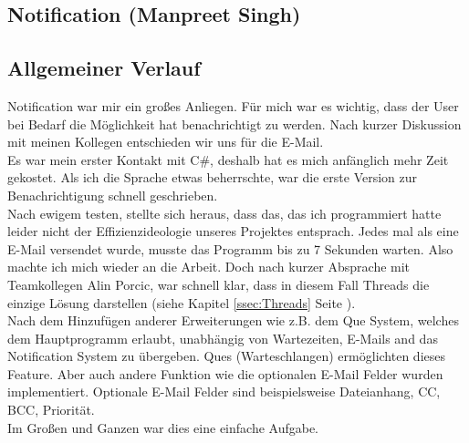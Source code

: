 \documentclass[12pt,a4paper]{report}
\begin{document}
\begin{onehalfspace}
\chapter{Notification (Manpreet Singh)}
\section{Allgemeiner Verlauf}
Notification war mir ein großes Anliegen. Für mich war es wichtig, dass der User bei Bedarf die Möglichkeit hat benachrichtigt zu werden. Nach kurzer Diskussion mit meinen Kollegen entschieden wir uns für die E-Mail.\\

Es war mein erster Kontakt mit C\#, deshalb hat es mich anfänglich mehr Zeit gekostet. Als ich die Sprache etwas beherrschte, war die erste Version zur Benachrichtigung schnell geschrieben. \\

Nach ewigem testen, stellte sich heraus, dass das, das ich programmiert hatte leider nicht der Effizienzideologie unseres Projektes entsprach. Jedes mal als eine E-Mail versendet wurde, musste das Programm bis zu 7 Sekunden warten. Also machte ich mich wieder an die Arbeit. Doch nach kurzer Absprache mit Teamkollegen Alin Porcic, war schnell klar, dass in diesem Fall Threads die einzige Lösung darstellen (siehe Kapitel \ref{ssec:Threads} Seite \pageref{ssec:Threads}).\\

Nach dem Hinzufügen anderer Erweiterungen wie z.B. dem Que System, welches dem Hauptprogramm erlaubt, unabhängig von Wartezeiten, E-Mails and das Notification System zu übergeben. Ques (Warteschlangen) ermöglichten dieses Feature. Aber auch andere Funktion wie die optionalen E-Mail Felder wurden implementiert. Optionale E-Mail Felder sind beispielsweise Dateianhang, CC, BCC, Priorität.\\

Im Großen und Ganzen war dies eine einfache Aufgabe.
\newpage

\end{onehalfspace}
\end{document}
